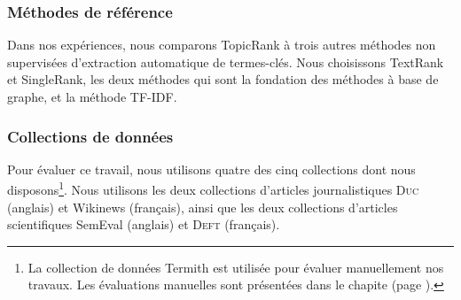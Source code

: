       \subsubsection{Méthodes de référence}
      \label{subsubsec:main-automatic_keyphrase_annotation-unsupervised_automatic_keyphrase_extraction-evaluation-baselines}
        Dans nos expériences, nous comparons TopicRank à trois autres
        méthodes non supervisées d'extraction automatique de termes-clés. Nous
        choisissons TextRank et SingleRank, les deux méthodes qui sont la
        fondation des méthodes à base de graphe, et la méthode TF-IDF.

      \subsubsection{Collections de données}
      \label{subsubsec:main-automatic_keyphrase_annotation-unsupervised_automatic_keyphrase_extraction-evaluation-evaluation_data}
        Pour évaluer ce travail, nous utilisons quatre des cinq collections dont
        nous disposons\footnote{La collection de données Termith est utilisée
        pour évaluer manuellement nos travaux. Les évaluations manuelles sont
        présentées dans le chapite  (page \TODO{}).}. Nous utilisons les
        deux collections d'articles journalistiques \textsc{Duc} (anglais) et
        Wikinews (français), ainsi que les deux collections d'articles
        scientifiques SemEval (anglais) et \textsc{Deft} (français).

